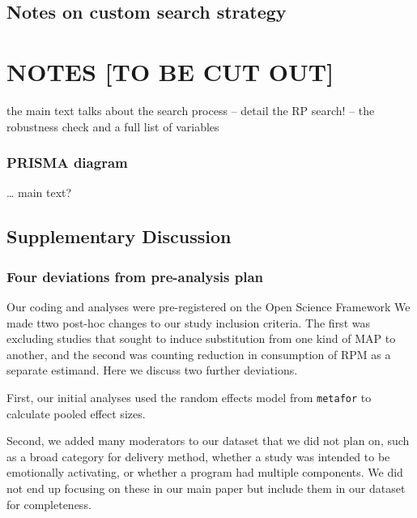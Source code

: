 \documentclass[sn-nature,referee,pdflatex]{sn-jnl}
\begin{document}
\subsection{Notes on custom search
strategy}\label{notes-on-custom-search-strategy}

\section{NOTES {[}TO BE CUT OUT{]}}\label{notes-to-be-cut-out}

the main text talks about the search process -- detail the RP search! --
the robustness check and a full list of variables

\begin{comment}
We used the following R packages:

- dplyr\
- forcats\
- ggplot2\
- ggtext\
- googledrive\
- kableExtra\
- knitr\
- MetaUtility\
- metafor\
- PublicationBias\
- purrr\
- Rmarkdown\
- robumeta\
- rprojroot\
- rticles\
- stringr\
- tidyr
\end{comment}

\subsubsection{PRISMA diagram}\label{prisma-diagram}

\ldots{} main text?

\subsection{Supplementary Discussion}\label{supplementary-discussion}

\subsubsection{Four deviations from pre-analysis
plan}\label{four-deviations-from-pre-analysis-plan}

Our coding and analyses were pre-registered on the Open Science
Framework We made ttwo post-hoc changes to our study inclusion criteria.
The first was excluding studies that sought to induce substitution from
one kind of MAP to another, and the second was counting reduction in
consumption of RPM as a separate estimand. Here we discuss two further
deviations.

First, our initial analyses used the random effects model from
\texttt{metafor} to calculate pooled effect sizes.

Second, we added many moderators to our dataset that we did not plan on,
such as a broad category for delivery method, whether a study was
intended to be emotionally activating, or whether a program had multiple
components. We did not end up focusing on these in our main paper but
include them in our dataset for completeness.
\end{document}
